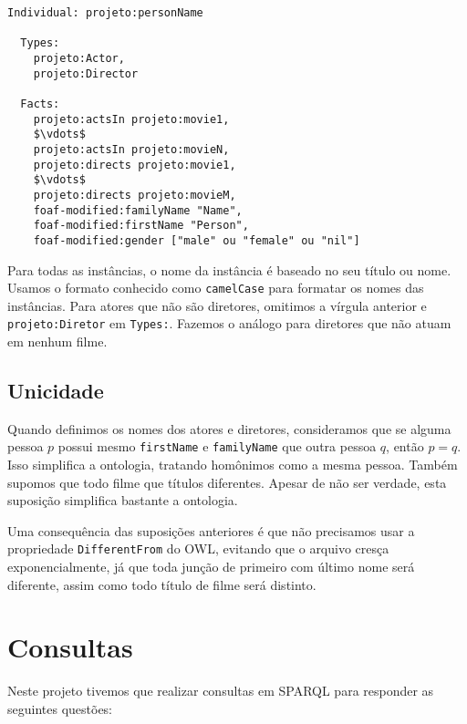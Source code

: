 \documentclass{article}
\newcommand{\code}[1]{\lstinline[mathescape=true]{#1}}
\begin{document}
\newpage

\begin{lstlisting}[frame=single,mathescape=true]
Individual: projeto:personName

  Types:
    projeto:Actor,
    projeto:Director

  Facts:
    projeto:actsIn projeto:movie1,
    $\vdots$
    projeto:actsIn projeto:movieN,
    projeto:directs projeto:movie1,
    $\vdots$
    projeto:directs projeto:movieM,
    foaf-modified:familyName "Name",
    foaf-modified:firstName "Person",
    foaf-modified:gender ["male" ou "female" ou "nil"]
\end{lstlisting}

Para todas as instâncias, o nome da instância é baseado no seu título ou nome. Usamos o formato
conhecido como \code{camelCase} para formatar os nomes das instâncias. Para atores que não são
diretores, omitimos a vírgula anterior e \code{projeto:Diretor} em \code{Types:}. Fazemos o análogo
para diretores que não atuam em nenhum filme.

\subsection{Unicidade}

Quando definimos os nomes dos atores e diretores, consideramos que se alguma pessoa $p$ possui
mesmo \code{firstName} e \code{familyName} que outra pessoa $q$, então $p=q$. Isso simplifica a
ontologia, tratando homônimos como a mesma pessoa. Também supomos que todo filme que títulos
diferentes. Apesar de não ser verdade, esta suposição simplifica bastante a ontologia.

Uma consequência das suposições anteriores é que não precisamos usar a propriedade
\code{DifferentFrom} do OWL, evitando que o arquivo cresça exponencialmente, já que toda junção de
primeiro com último nome será diferente, assim como todo título de filme será distinto.

\section{Consultas}


Neste projeto tivemos que realizar consultas em SPARQL para responder as seguintes questões:
\end{document}
